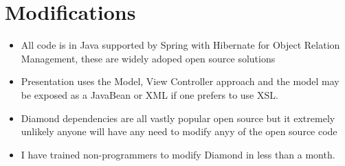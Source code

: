 \documentclass[letterpaper,10pt,english]{sphinxmanual}
\begin{document}
\chapter{Modifications}
\label{\detokenize{BusinessProcessReengineering:modifications}}\begin{itemize}
\item {} 
All code is in Java supported by Spring with Hibernate for Object
Relation Management, these are widely adoped open source solutions

\item {} 
Presentation uses the Model, View Controller approach and the model
may be exposed as a JavaBean or XML if one prefers to use XSL.

\item {} 
Diamond dependencies are all vastly popular open source but it
extremely unlikely anyone will have any need to modify anyy of the
open source code

\item {} 
I have trained non-programmers to modify Diamond in less than a
month.

\end{itemize}
\end{document}
